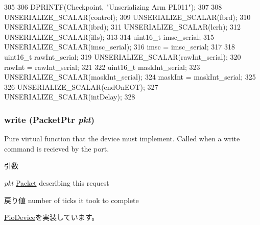 \begin{DoxyCode}
305 {
306     DPRINTF(Checkpoint, "Unserializing Arm PL011\n");
307 
308     UNSERIALIZE_SCALAR(control);
309     UNSERIALIZE_SCALAR(fbrd);
310     UNSERIALIZE_SCALAR(ibrd);
311     UNSERIALIZE_SCALAR(lcrh);
312     UNSERIALIZE_SCALAR(ifls);
313 
314     uint16_t imsc_serial;
315     UNSERIALIZE_SCALAR(imsc_serial);
316     imsc = imsc_serial;
317 
318     uint16_t rawInt_serial;
319     UNSERIALIZE_SCALAR(rawInt_serial);
320     rawInt = rawInt_serial;
321 
322     uint16_t maskInt_serial;
323     UNSERIALIZE_SCALAR(maskInt_serial);
324     maskInt = maskInt_serial;
325 
326     UNSERIALIZE_SCALAR(endOnEOT);
327     UNSERIALIZE_SCALAR(intDelay);
328 }
\end{DoxyCode}
\hypertarget{classPl011_a4cefab464e72b5dd42c003a0a4341802}{
\subsubsection[{write}]{ write ({\bf PacketPtr} {\em pkt})}}
\label{classPl011_a4cefab464e72b5dd42c003a0a4341802}
Pure virtual function that the device must implement. Called when a write command is recieved by the port. 
\begin{DoxyParams}{引数}
\item[{\em pkt}]\hyperlink{classPacket}{Packet} describing this request \end{DoxyParams}
\begin{DoxyReturn}{戻り値}
number of ticks it took to complete 
\end{DoxyReturn}


\hyperlink{classPioDevice_afe8371668d023bb2516b286e5e399b6f}{PioDevice}を実装しています。


